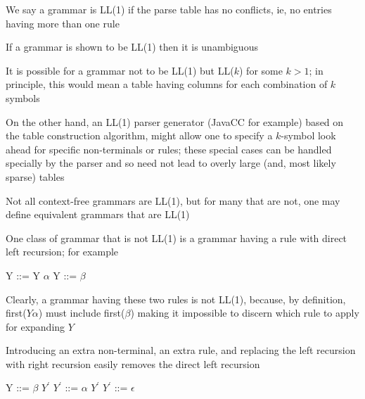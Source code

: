 \documentclass[8pt,a4paper,compress]{beamer}
\newcommand{\mm}[1]{$#1$}
\newcommand{\expo}[2]{$#1^{#2}$}
\newenvironment{spaced}
{
\smallskip
\hspace{.5cm}
\begin{minipage}[c]{\textwidth}
}
{
\end{minipage}
\smallskip
}
\begin{document}
\begin{frame}[fragile]
\pause

We say a grammar is LL(1) if the parse table has no conflicts, ie, no entries having more than one rule

\pause
\bigskip

If a grammar is shown to be LL(1) then it is unambiguous

\pause
\bigskip

It is possible for a grammar not to be LL(1) but LL($k$) for some $k > 1$; in principle, this would mean a table having columns for each combination of $k$ symbols

\pause
\bigskip

On the other hand, an LL(1) parser generator (JavaCC for example) based on the table construction algorithm, might allow one to specify a $k$-symbol look ahead for specific non-terminals or rules; these special cases can be handled specially by the parser and so need not lead to overly large (and, most likely sparse) tables
\end{frame}

\begin{frame}[fragile]
\pause

Not all context-free grammars are LL(1), but for many that are not, one may define equivalent grammars that are LL(1)

\pause
\bigskip

One class of grammar that is not LL(1) is a grammar having a rule with direct left recursion; for example 

\text{ }
\begin{spaced}
\begin{production}
Y ::= Y \mm{\alpha}
Y ::= \mm{\beta}
\end{production}
\end{spaced}

\pause

Clearly, a grammar having these two rules is not LL(1), because, by definition, first($Y \alpha$) must include first($\beta$) making it impossible to discern which rule to apply for expanding $Y$

\pause
\bigskip

Introducing an extra non-terminal, an extra rule, and replacing the left recursion with right recursion easily removes the direct left recursion

\text{ }
\begin{spaced}
\begin{production}
Y  ::= \mm{\beta} \expo{Y}{\prime}
\expo{Y}{\prime} ::= \mm{\alpha} \expo{Y}{\prime}
\expo{Y}{\prime} ::= \mm{\epsilon}
\end{production}
\end{spaced}
\end{frame}
\end{document}
